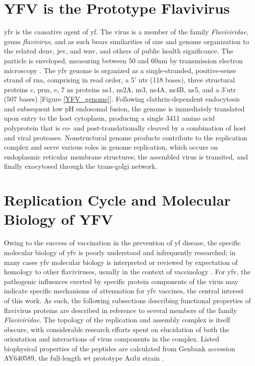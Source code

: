 \section{YFV is the Prototype Flavivirus}
\Gls{yfv} is the causative agent of \gls{yf}. The virus is a member of the family \emph{Flaviviridae}, genus \emph{flavivirus}, and as such bears similarities of size and genome organization to the related \gls{denv}, \gls{jev}, and \gls{wnv}, and others of public health significance. The particle is enveloped, measuring between 50 and 60nm by transmission electron microscopy \parencite{BurlaudGaillard:2014ia}. The \gls{yfv} genome is organized as a single-stranded, positive-sense strand of \gls{rna}, comprising in read order, a 5’ \gls{utr} (118 bases), three structural proteins \gls{c}, \gls{prm}, \gls{e}, 7 \gls{ns} proteins \gls{ns}1, \gls{ns}2A, \gls{ns}3, \gls{ns}4A, \gls{ns}4B, \gls{ns}5, and a 3’\gls{utr} (507 bases) [Figure \ref{YFV_genome}]. Following clathrin-dependent endocytosis and subsequent low pH endosomal fusion, the genome is immediately translated upon entry to the host cytoplasm, producing a single 3411 amino acid polyprotein that is co- and post-translationally cleaved by a combination of host and viral proteases. Nonstructural genome products contribute to the replication complex and serve various roles in genome replication, which occurs on endoplasmic reticular membrane structures; the assembled virus is transited, and finally exocytosed through the trans-golgi network. 

\section{Replication Cycle and Molecular Biology of YFV}
Owing to the success of vaccination in the prevention of \gls{yf} disease, the specific molecular biology of \gls{yfv} is poorly understood and infrequently researched; in many cases \gls{yfv} molecular biology is interpreted or reviewed by expectation of homology to other flaviviruses, usually in the context of vaccinology \parencite{Monath:2013cu}. For \gls{yfv}, the pathogenic influences exerted by specific protein components of the virus may indicate specific mechanisms of attenuation for \gls{yfv} vaccines, the central interest of this work. As such, the following subsections describing functional properties of flavivirus proteins are described in reference to several members of the family \emph{Flaviviridae}. The topology of the replication and assembly complex is itself obscure, with considerable research efforts spent on elucidation of both the orientation and interactions of virus components in the complex. Listed biophysical properties of the peptides are calculated from Genbank accession AY640589, the full-length \gls{wt} prototype Asibi strain \parencite{McElroy:2005ik}.

